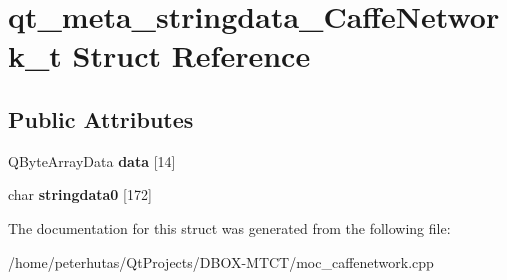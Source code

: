 \hypertarget{structqt__meta__stringdata___caffe_network__t}{}\section{qt\+\_\+meta\+\_\+stringdata\+\_\+\+Caffe\+Network\+\_\+t Struct Reference}
\label{structqt__meta__stringdata___caffe_network__t}
\subsection*{Public Attributes}
\begin{DoxyCompactItemize}
\item 
\mbox{\label{structqt__meta__stringdata___caffe_network__t_a159b42d708b3bea3995e5a16f57dcc84}} 
Q\+Byte\+Array\+Data {\bfseries data} \mbox{[}14\mbox{]}
\item 
\mbox{\label{structqt__meta__stringdata___caffe_network__t_abe09ce63f8a9d4f2dcdf37d62396ffa7}} 
char {\bfseries stringdata0} \mbox{[}172\mbox{]}
\end{DoxyCompactItemize}


The documentation for this struct was generated from the following file\+:\begin{DoxyCompactItemize}
\item 
/home/peterhutas/\+Qt\+Projects/\+D\+B\+O\+X-\/\+M\+T\+C\+T/moc\+\_\+caffenetwork.\+cpp\end{DoxyCompactItemize}

